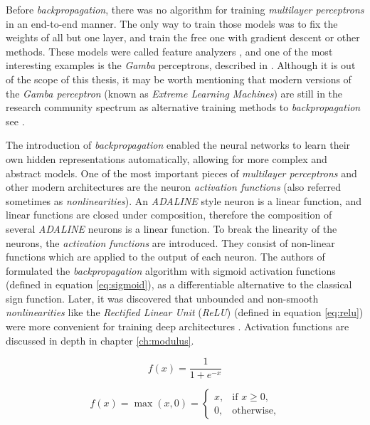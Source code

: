 Before \textit{backpropagation}, there was no algorithm for training \textit{multilayer perceptrons} in an end-to-end manner. The only way to train those models was to fix the weights of all but one layer, and train the free one with gradient descent or other methods. These models were called feature analyzers \autocite{hinton1986}, and one of the most interesting examples is the \textit{Gamba} perceptrons, described in \autocite{minsky69}. Although it is out of the scope of this thesis, it may be worth mentioning that modern versions of the \textit{Gamba perceptron} (known as \textit{Extreme Learning Machines}) are still in the research community spectrum as alternative training methods to \textit{backpropagation} see \autocite{Huang2006, Huang2012}.

The introduction of \textit{backpropagation} enabled the neural networks to learn their own hidden representations automatically, allowing for more complex and abstract models. One of the most important pieces of \textit{multilayer perceptrons} and other modern architectures are the neuron \textit{activation functions} (also referred sometimes as \textit{nonlinearities}). An \textit{ADALINE} style neuron is a linear function, and linear functions are closed under composition, therefore the composition of several \textit{ADALINE} neurons is a linear function. To break the linearity of the neurons, the \textit{activation functions} are introduced. They consist of non-linear functions which are applied to the output of each neuron. The authors of \autocite{hinton1986} formulated the \textit{backpropagation} algorithm with sigmoid activation functions (defined in equation \ref{eq:sigmoid}), as a differentiable alternative to the classical sign function. Later, it was discovered that unbounded and non-smooth \textit{nonlinearities} like the \textit{Rectified Linear Unit} (\textit{ReLU}) \autocite{nair2010} (defined in equation \ref{eq:relu}) were more convenient for training deep architectures \autocite{Goodfellow2016}. Activation functions are discussed in depth in chapter \ref{ch:modulus}.


\begin{equation}
\label{eq:sigmoid}
f(x) = \frac{1}{1+e^{-x}}
\end{equation}

\begin{equation}
\label{eq:relu}
f(x) = \max(x, 0) =
\begin{cases}
x,          & \text{if } x \geq 0 ,\\
0,         & \text{otherwise},
\end{cases}
\end{equation}


